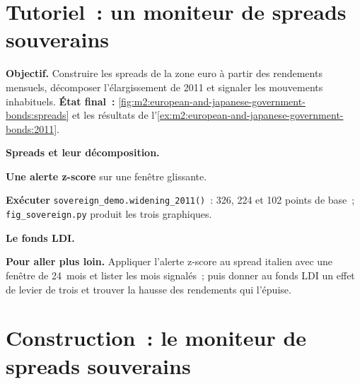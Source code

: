\section{Tutoriel~: un moniteur de spreads souverains}\label{tut:m2:european-and-japanese-government-bonds:monitor}

\begin{tutorial}
\textbf{Objectif.} Construire les spreads de la zone euro à partir des rendements mensuels, décomposer l'élargissement de 2011
et signaler les mouvements inhabituels. \textbf{État final~:}
\cref{fig:m2:european-and-japanese-government-bonds:spreads} et les résultats de
l'\cref{ex:m2:european-and-japanese-government-bonds:2011}.
\begin{tutsteps}
\item \textbf{Spreads et leur décomposition.}
\label{lst:m2:european-and-japanese-government-bonds:spreads}
\item \textbf{Une alerte z-score} sur une fenêtre glissante.
\label{lst:m2:european-and-japanese-government-bonds:z}
\item \textbf{Exécuter} \texttt{sovereign\_demo.widening\_2011()}~: 326, 224 et 102
points de base~; \texttt{fig\_sovereign.py} produit les trois graphiques.
\item \textbf{Le fonds LDI.}
\label{lst:m2:european-and-japanese-government-bonds:fund}
\end{tutsteps}
\textbf{Pour aller plus loin.} Appliquer l'alerte z-score au spread italien avec une
fenêtre de 24~mois et lister les mois signalés~; puis donner au fonds LDI un effet de levier de trois
et trouver la hausse des rendements qui l'épuise.
\end{tutorial}

\section{Construction~: le moniteur de spreads souverains}\label{bld:m2:european-and-japanese-government-bonds:monitor}

